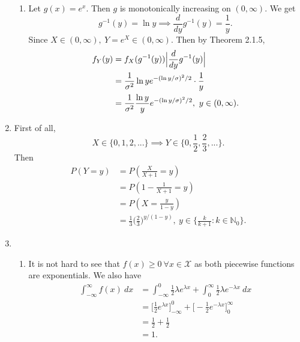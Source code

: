 \documentclass{article}
\begin{document}
\begin{enumerate}
\begin{enumerate}
        \item Let $g(x) = e^{x}$. Then $g$ is monotonically increasing on $(0, \infty)$. We get 
        \[
        g^{-1}(y) = \ln{y} \implies \frac{d}{dy}g^{-1}(y) = \frac{1}{y}.
        \]
        Since $X \in (0, \infty), \ Y = e^{X} \in (0, \infty)$. Then by Theorem 2.1.5, 
        \begin{align*}
            f_{Y}(y)
            &= f_{X}(g^{-1}(y)) \Bigl|\frac{d}{dy}g^{-1}(y)\Bigr| \\
            &= \frac{1}{\sigma^2} \ln{y} e^{-(\ln{y}/\sigma)^2 /2} \cdot \frac{1}{y} \\
            &= \frac{1}{\sigma^2} \frac{\ln{y}}{y} e^{-(\ln{y}/\sigma)^2 / 2}, \ y \in (0, \infty).
        \end{align*}
    \end{enumerate}

    \item First of all, 
    \[ X \in \{0, 1, 2, ...\} \implies Y \in \Big\{0, \frac{1}{2}, \frac{2}{3}, ...\Big\}. \]
    Then
    \begin{align*}
        P(Y = y) 
        &= P(\frac{X}{X + 1} = y) \\
        &= P(1 - \frac{1}{X + 1} = y) \\
        &= P(X = \frac{y}{1 - y}) \\
        &= \frac{1}{3} \Big( \frac{2}{3} \Big)^{y / (1 - y)}, \ y \in \Big\{\frac{k}{k + 1}: k \in 
        \mathbb{N}_0 \Big\}.
    \end{align*}
    
    \item \begin{enumerate}
        \item It is not hard to see that $f(x) \geq 0 \ \forall x \in \mathcal{X}$ as both piecewise 
        functions are exponentials. We also have 
        \begin{align*}
            \int_{-\infty}^{\infty} f(x) \ dx 
            &= \int_{-\infty}^{0} \frac{1}{2}\lambda e^{\lambda x} 
            + \int_{0}^{\infty} \frac{1}{2}\lambda e^{-\lambda x} \ dx \\
            &= \Big[\frac{1}{2}e^{\lambda x} \Big]_{-\infty}^{0} + \Big[ -\frac{1}{2}e^{-\lambda x} 
            \Big]_{0}^{\infty} \\
            &= \frac{1}{2} + \frac{1}{2} \\
            &= 1.
        \end{align*}


\end{enumerate}
\end{enumerate}
\end{document}
